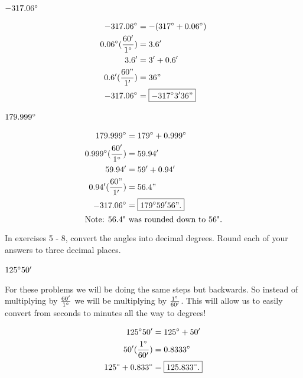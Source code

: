\documentclass[10pt,letterpaper]{amspset}
\begin{document}
\pagebreak

\begin{problem} [3.]
    $ -317.06\degree$    
\end{problem}

\begin{solution}
\begin{align}
    -317.06\degree &= -(317\degree + 0.06\degree) \\
    0.06\degree (\frac{60'}{1\degree}) &= 3.6' \\
    3.6' &= 3' + 0.6' \\
    0.6' (\frac{60"}{1'}) &= 36" \\
    -317.06\degree &= \boxed{-317\degree 3' 36"} \\
\end{align}
\end{solution}


\begin{problem} [4.]
    $179.999\degree$
\end{problem}

\begin{solution}
\begin{align}
    179.999\degree &= 179\degree + 0.999\degree \\
    0.999\degree (\frac{60'}{1\degree}) &= 59.94' \\
    59.94' &= 59' + 0.94' \\
    0.94' (\frac{60"}{1'}) &= 56.4" \\
    -317.06\degree &= \boxed{179\degree 59' 56".} \\
    \intertext{Note: 56.4" was rounded down to 56".}
\end{align}
\end{solution}


\hrulefill


In exercises 5 - 8, convert the angles into decimal degrees. Round each of your answers to three decimal places.

\begin{problem} [5.]
    $125\degree 50'$
\end{problem}

\begin{solution}[Solution]
For these problems we will be doing the same steps but backwards. So instead of multiplying by $\frac{60'}{1\degree}$ we will be multiplying by $\frac{1\degree}{60'}$. This will allow us to easily convert from seconds to minutes all the way to degrees! 

\begin{align}
    125\degree 50' &= 125\degree + 50' \\
    50' (\frac{1\degree}{60'}) &= 0.8333\degree \\
    125\degree + 0.833\degree &= \boxed{125.833\degree.}
\end{align}
\end{solution}
\end{document}
